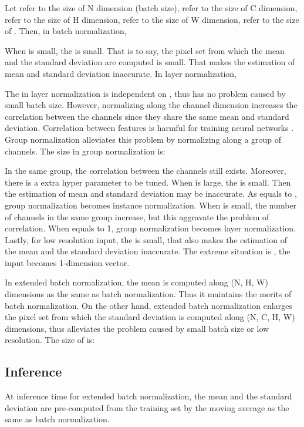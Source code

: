 \documentclass[runningheads]{llncs}
\begin{document}
Let  refer to the size of N dimension (batch size),  refer to the size of C dimension,  refer to the size of H dimension,  refer to the size of W dimension,  refer to the size of . Then, in batch normalization, 

When  is small, the  is small. That is to say, the pixel set from which the mean and the standard deviation are computed is small. That makes the estimation of mean and standard deviation inaccurate. In layer normalization,

The  in layer normalization is independent on , thus has no problem caused by small batch size. However, normalizing along the channel dimension increases the correlation between the channels since they share the same mean and standard deviation. Correlation between features is harmful for training neural networks \cite{lecun2012efficient}. Group normalization alleviates this problem by normalizing along a group of channels. The size  in group normalization is:

In the same group, the correlation between the channels still exists. Moreover, there is a extra hyper parameter  to be tuned. When  is large, the  is small. Then the estimation of mean and standard deviation may be inaccurate. As  equals to , group normalization becomes instance normalization. When  is small, the number of channels in the same group increase, but this aggravate the problem of correlation. When  equals to 1, group normalization becomes layer normalization. Lastly, for low resolution input, the  is small, that also makes the estimation of the mean and the standard deviation  inaccurate. The extreme situation is , the input becomes 1-dimension vector.

In extended batch normalization, the mean is computed along (N, H, W) dimensions as the same as batch normalization. Thus it maintains the merits of batch normalization. On the other hand, extended batch normalization enlarges the pixel set  from which  the standard deviation is computed along (N, C, H, W) dimensions,  thus alleviates the problem caused by small batch size or low resolution.  The size of  is: 


\subsection{Inference}
At inference time for extended batch normalization, the mean and the standard deviation are pre-computed
from the training set by the moving average as the same as batch normalization. 
\end{document}
